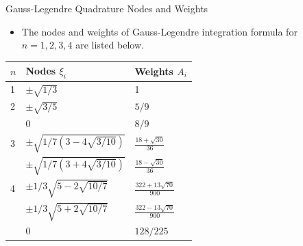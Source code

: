 \documentclass{beamer}
\newcommand{\beforeverb}{\footnotesize}
\newcommand{\afterverb}{\normalsize}
\begin{document}
\begin{frame}{Gauss-Legendre Quadrature Nodes and Weights}

\begin{itemize}
\item The nodes and weights of Gauss-Legendre integration formula for $n=1, 2, 3, 4 $ are listed below.
\end{itemize}
\begin{center}
\begin{tabular}{|l|l|l|}
\hline
$n$& Nodes $\xi_i$ & Weights $A_i$ \\
\hline
1 & $\pm\sqrt{1/3}$ & 1\\
\hline
2 & $\pm\sqrt{3/5}$ & $5/9$ \\
 & 0 & $8/9$ \\
\hline
3 & $\pm\sqrt{1/7(3-4\sqrt{3/10})}$ & $\frac{18+\sqrt{30}}{36}$ \\
 & $\pm\sqrt{1/7(3+4\sqrt{3/10})}$ & $\frac{18-\sqrt{30}}{36}$ \\\hline
4 & $\pm1/3\sqrt{5-2\sqrt{10/7}}$ & $\frac{322+13\sqrt{70}}{900}$ \\
& $\pm1/3 \sqrt{5+2\sqrt{10/7}}$ & $\frac{322-13\sqrt{70}}{900}$ \\
&0 & $128/225$\\ \hline 

\end{tabular}
\end{center}
\afterverb
\end{frame}
\end{document}
